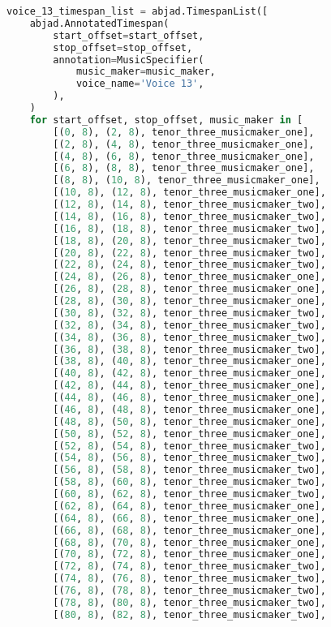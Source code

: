 \begin{lstlisting}[language=Python, caption=Invocation Source Code]
voice_13_timespan_list = abjad.TimespanList([
    abjad.AnnotatedTimespan(
        start_offset=start_offset,
        stop_offset=stop_offset,
        annotation=MusicSpecifier(
            music_maker=music_maker,
            voice_name='Voice 13',
        ),
    )
    for start_offset, stop_offset, music_maker in [
        [(0, 8), (2, 8), tenor_three_musicmaker_one],
        [(2, 8), (4, 8), tenor_three_musicmaker_one],
        [(4, 8), (6, 8), tenor_three_musicmaker_one],
        [(6, 8), (8, 8), tenor_three_musicmaker_one],
        [(8, 8), (10, 8), tenor_three_musicmaker_one],
        [(10, 8), (12, 8), tenor_three_musicmaker_one],
        [(12, 8), (14, 8), tenor_three_musicmaker_two],
        [(14, 8), (16, 8), tenor_three_musicmaker_two],
        [(16, 8), (18, 8), tenor_three_musicmaker_two],
        [(18, 8), (20, 8), tenor_three_musicmaker_two],
        [(20, 8), (22, 8), tenor_three_musicmaker_two],
        [(22, 8), (24, 8), tenor_three_musicmaker_two],
        [(24, 8), (26, 8), tenor_three_musicmaker_one],
        [(26, 8), (28, 8), tenor_three_musicmaker_one],
        [(28, 8), (30, 8), tenor_three_musicmaker_one],
        [(30, 8), (32, 8), tenor_three_musicmaker_two],
        [(32, 8), (34, 8), tenor_three_musicmaker_two],
        [(34, 8), (36, 8), tenor_three_musicmaker_two],
        [(36, 8), (38, 8), tenor_three_musicmaker_two],
        [(38, 8), (40, 8), tenor_three_musicmaker_one],
        [(40, 8), (42, 8), tenor_three_musicmaker_one],
        [(42, 8), (44, 8), tenor_three_musicmaker_one],
        [(44, 8), (46, 8), tenor_three_musicmaker_one],
        [(46, 8), (48, 8), tenor_three_musicmaker_one],
        [(48, 8), (50, 8), tenor_three_musicmaker_one],
        [(50, 8), (52, 8), tenor_three_musicmaker_one],
        [(52, 8), (54, 8), tenor_three_musicmaker_two],
        [(54, 8), (56, 8), tenor_three_musicmaker_two],
        [(56, 8), (58, 8), tenor_three_musicmaker_two],
        [(58, 8), (60, 8), tenor_three_musicmaker_two],
        [(60, 8), (62, 8), tenor_three_musicmaker_two],
        [(62, 8), (64, 8), tenor_three_musicmaker_one],
        [(64, 8), (66, 8), tenor_three_musicmaker_one],
        [(66, 8), (68, 8), tenor_three_musicmaker_one],
        [(68, 8), (70, 8), tenor_three_musicmaker_one],
        [(70, 8), (72, 8), tenor_three_musicmaker_one],
        [(72, 8), (74, 8), tenor_three_musicmaker_two],
        [(74, 8), (76, 8), tenor_three_musicmaker_two],
        [(76, 8), (78, 8), tenor_three_musicmaker_two],
        [(78, 8), (80, 8), tenor_three_musicmaker_two],
        [(80, 8), (82, 8), tenor_three_musicmaker_two],

\end{lstlisting}
